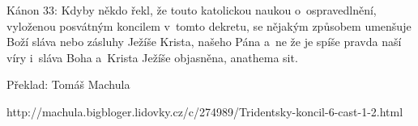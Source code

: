 \canon
Kánon 33: Kdyby někdo řekl, že touto katolickou naukou o~ospravedlnění, vyloženou
posvátným koncilem v~tomto dekretu, se nějakým způsobem umenšuje Boží sláva nebo
zásluhy Ježíše Krista, našeho Pána a~ne že je spíše pravda naší víry i~sláva Boha
a~Krista Ježíše objasněna, anathema sit.

 

 
\autor Překlad: Tomáš Machula

\noindent
\source http://machula.bigbloger.lidovky.cz/c/274989/Tridentsky-koncil-6-cast-1-2.html

\bye

